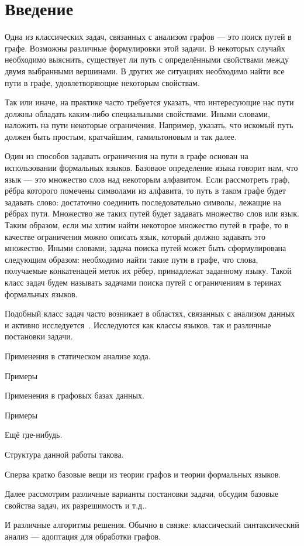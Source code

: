 \chapter*{Введение}


Одна из классических задач, связанных с анализом графов --- это поиск путей в графе.
Возможны различные формулировки этой задачи.
В некоторых случайх необходимо выяснить, существует ли путь с определёнными свойствами между двумя выбранными вершинами.
В других же ситуациях необходимо найти все пути в графе, удовлетворяющие некоторым свойствам.

Так или иначе, на практике часто требуется указать, что интересующие нас пути должны обладать каким-либо специальными свойствами.
Иными словами, наложить на пути некоторые ограничения.
Например, указать, что искомый путь должен быть простым, кратчайшим, гамильтоновым и так далее.

Один из способов задавать ограничения на пути в графе основан на использовании формальных языков.
Базоваое определение языка говорит нам, что язык --- это множество слов над некоторым алфавитом.
Если рассмотреть граф, рёбра которого помечены символами из алфавита, то путь в таком графе будет задавать слово: достаточно соединить последовательно символы, лежащие на рёбрах пути.
Множество же таких путей будет задавать множество слов или язык.
Таким образом, если мы хотим найти некоторое множество путей в графе, то в качестве ограничения можно описать язык, который должно задавать это множество.
Иными словами, задача поиска путей может быть сформулирована следующим образом: необходимо найти такие пути в графе, что слова, получаемые конкатенацей меток их рёбер, принадлежат заданному языку.
Такой класс задач будем называть задачами поиска путей с ограничениям в теринах формальных языков.

Подобный класс задач часто возникает в областях, связанных с анализом данных и активно исследуется~\cite{doi:10.1137/S0097539798337716,axelsson2011formal,10.1007/978-3-642-22321-1_24,Ward:2010:CRL:1710158.1710234,barrett2007label,doi:10.1137/S0097539798337716}.
Исследуются как классы языков, так и различные постановки задачи.

Применения в статическом анализе кода.
\begin{example}
Примеры
\end{example}

Применения в графовых базах данных.
\begin{example}
Примеры
\end{example}

Ещё где-нибудь.

Структура данной работы такова.

Сперва кратко базовые вещи из теории графов и теории формальных языков.

Далее рассмотрим различные варианты постановки задачи, обсудим базовые свойства задач, их разрешимость и т.д..

И различные алгоритмы решения.
Обычно в связке: классический синтаксический анализ --- адоптация для обработки графов.


